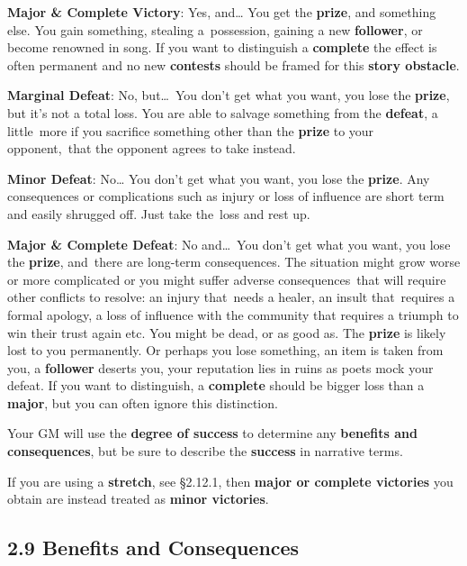 \documentclass[
]{article}
\begin{document}
\textbf{Major \& Complete Victory}: Yes, and\ldots{} You get the
\textbf{prize}, and something else. You gain something, stealing
a~possession, gaining a new \textbf{follower}, or become renowned in
song. If you want to distinguish a \textbf{complete} the effect is often
permanent and no new \textbf{contests} should be framed for this
\textbf{story obstacle}.

\textbf{Marginal Defeat}: No, but\ldots~You don't get what you want, you
lose the \textbf{prize}, but it's not a total loss. You are able to
salvage something from the \textbf{defeat}, a little~more if you
sacrifice something other than the \textbf{prize} to your opponent,~that
the opponent agrees to take instead.

\textbf{Minor Defeat}: No\ldots{} You don't get what you want, you lose
the \textbf{prize}. Any consequences or complications such as injury or
loss of influence are short term and easily shrugged off. Just take
the~loss and rest up.

\textbf{Major \& Complete Defeat}: No and\ldots~You don't get what you
want, you lose the \textbf{prize}, and~there are long-term consequences.
The situation might grow worse or more complicated or you might suffer
adverse consequences~that will require other conflicts to resolve: an
injury that~needs a healer, an insult that~requires a formal apology, a
loss of influence with the community that requires a triumph to win
their trust again etc. You might be dead, or as good as. The
\textbf{prize} is likely lost to you permanently. Or perhaps you lose
something, an item is taken from you, a \textbf{follower} deserts you,
your reputation lies in ruins as poets mock your defeat. If you want to
distinguish, a \textbf{complete} should be bigger loss than a
\textbf{major}, but you can often ignore this distinction.

Your GM will use the \textbf{degree of success} to determine any
\textbf{benefits and consequences}, but be sure to describe the
\textbf{success} in narrative terms.

If you are using a \textbf{stretch}, see §2.12.1, then \textbf{major or
complete victories} you obtain are instead treated as \textbf{minor
victories}.

\hypertarget{benefits-and-consequences}{%
\subsection{2.9 Benefits and
Consequences}\label{benefits-and-consequences}}
\end{document}
